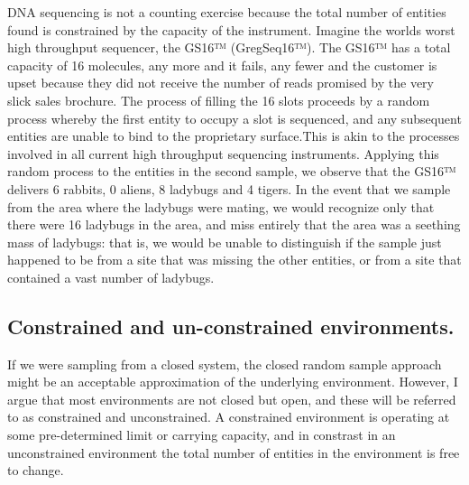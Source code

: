 \documentclass[onecolumn]{article}
\begin{document}
DNA sequencing is not a counting exercise because the total number of entities found is constrained by the capacity of the instrument. Imagine the worlds worst high throughput sequencer, the GS16™ (GregSeq16™). The GS16™ has a total capacity of 16 molecules, any more and it fails, any fewer and the customer is upset because they did not receive the number of reads promised by the very slick sales brochure. The process of filling the 16 slots proceeds by a random process whereby the first entity to occupy a slot is sequenced, and any subsequent entities are unable to bind to the proprietary surface.This is akin to the processes involved in all current high throughput sequencing instruments. Applying this random process to the entities in the second sample, we observe that the GS16™ delivers 6 rabbits, 0 aliens, 8 ladybugs and 4 tigers. In the event that we sample from the area where the ladybugs were mating, we would recognize only that there were 16 ladybugs in the area, and miss entirely that the area was a seething mass of ladybugs: that is, we would be unable to distinguish if the sample just happened to be from a site that was missing the other entities, or from a site that contained a vast number of ladybugs.

\hypertarget{constrained-and-un-constrained-environments.}{%
\subsection{Constrained and un-constrained environments.}\label{constrained-and-un-constrained-environments.}}

If we were sampling from a closed system, the closed random sample approach might be an acceptable approximation of the underlying environment. However, I argue that most environments are not closed but open, and these will be referred to as constrained and unconstrained. A constrained environment is operating at some pre-determined limit or carrying capacity, and in constrast in an unconstrained environment the total number of entities in the environment is free to change.
\end{document}
